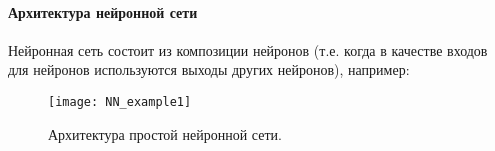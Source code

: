 


\paragraph{Архитектура нейронной сети}

Нейронная сеть состоит из композиции нейронов (т.е. когда в качестве входов для 
нейронов используются выходы других нейронов), например:

\begin{figure}[h!]
    \centering
    \texttt{[image: NN\_example1]}
    \caption{Архитектура простой нейронной сети.}
    \label{fig:NN1}
\end{figure}


